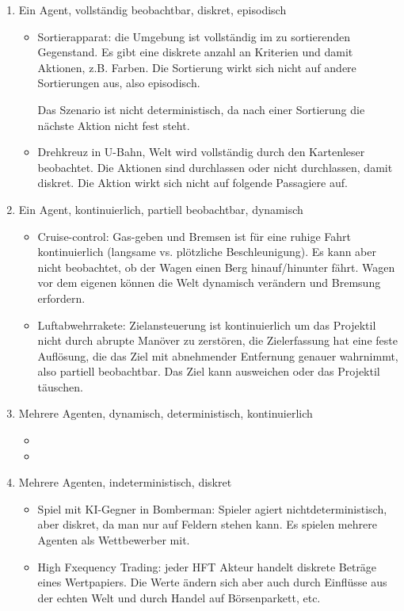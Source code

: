 \begin{enumerate}
	\item Ein Agent, vollständig beobachtbar, diskret, episodisch
	\begin{itemize}
		\item Sortierapparat: die Umgebung ist vollständig im zu sortierenden Gegenstand. Es gibt eine diskrete anzahl an Kriterien und damit Aktionen, z.B. Farben. Die Sortierung wirkt sich nicht auf andere Sortierungen aus, also episodisch.
		
		Das Szenario ist nicht deterministisch, da nach einer Sortierung die nächste Aktion nicht fest steht.
		
		\item Drehkreuz in U-Bahn, Welt wird vollständig durch den Kartenleser beobachtet. Die Aktionen sind durchlassen oder nicht durchlassen, damit diskret. Die Aktion wirkt sich nicht auf folgende Passagiere auf.
	\end{itemize}
	
	\item Ein Agent, kontinuierlich, partiell beobachtbar, dynamisch
	\begin{itemize}
		\item Cruise-control: Gas-geben und Bremsen ist für eine ruhige Fahrt kontinuierlich (langsame vs. plötzliche Beschleunigung). Es kann aber nicht beobachtet, ob der Wagen einen Berg hinauf/hinunter fährt. Wagen vor dem eigenen können die Welt dynamisch verändern und Bremsung erfordern.
		
		\item Luftabwehrrakete: Zielansteuerung ist kontinuierlich um das Projektil nicht durch abrupte Manöver zu zerstören, die Zielerfassung hat eine feste Auflösung, die das Ziel mit abnehmender Entfernung genauer wahrnimmt, also partiell beobachtbar. Das Ziel kann ausweichen oder das Projektil täuschen.
	\end{itemize}
	
	\item Mehrere Agenten, dynamisch, deterministisch, kontinuierlich
	\begin{itemize}
		\item 
		
		\item 
	\end{itemize}
	
	\item Mehrere Agenten, indeterministisch, diskret
	\begin{itemize}
		\item Spiel mit KI-Gegner in Bomberman: Spieler agiert nichtdeterministisch, aber diskret, da man nur auf Feldern stehen kann. Es spielen mehrere Agenten als Wettbewerber mit.
		
		\item High Fxequency Trading: jeder HFT Akteur handelt diskrete Beträge eines Wertpapiers. Die Werte ändern sich aber auch durch Einflüsse aus der echten Welt und durch Handel auf Börsenparkett, etc.
	\end{itemize}
	
\end{enumerate}